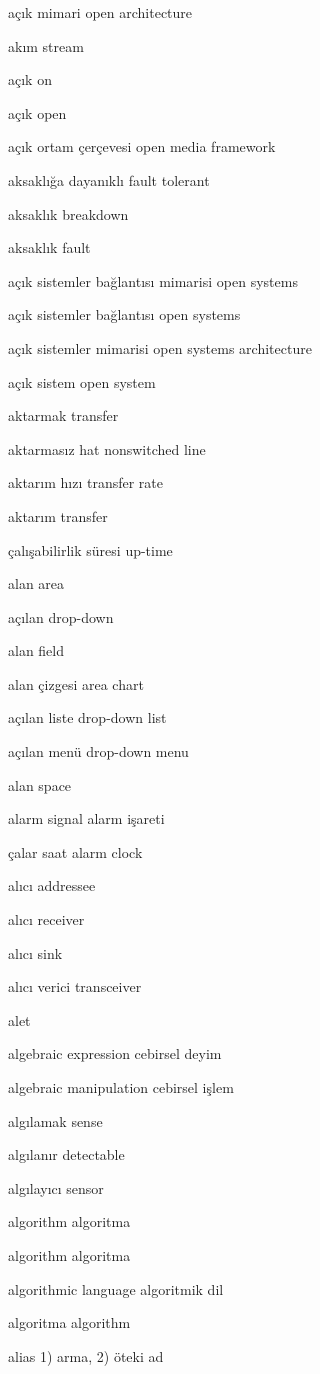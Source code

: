 \documentclass[12pt,fleqn]{article}\usepackage{../../common}
\begin{document}
açık mimari open architecture

akım stream

açık on

açık open

açık ortam çerçevesi open media framework

aksaklığa dayanıklı fault tolerant

aksaklık breakdown

aksaklık fault

açık sistemler bağlantısı mimarisi open systems

açık sistemler bağlantısı open systems

açık sistemler mimarisi open systems architecture

açık sistem open system

aktarmak transfer

aktarmasız hat nonswitched line

aktarım hızı transfer rate

aktarım transfer

çalışabilirlik süresi up-time

alan area

açılan drop-down

alan field

alan çizgesi area chart

açılan liste drop-down list

açılan menü drop-down menu

alan space

alarm signal alarm işareti

çalar saat alarm clock

alıcı addressee

alıcı receiver

alıcı sink

alıcı verici transceiver

alet

algebraic expression cebirsel deyim

algebraic manipulation cebirsel işlem

algılamak sense

algılanır detectable

algılayıcı sensor

algorithm algoritma

algorithm algoritma

algorithmic language algoritmik dil

algoritma algorithm

alias 1) arma, 2) öteki ad
\end{document}
